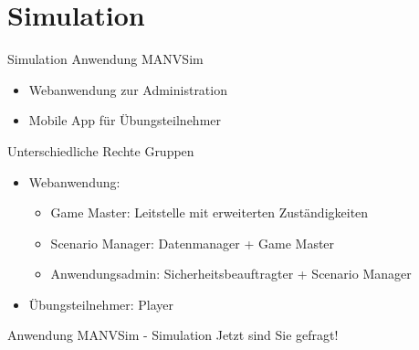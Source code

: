 %
%
\section{Simulation}

\begin{frame}{Simulation}
	Anwendung MANVSim
	\begin{itemize}
		\item Webanwendung zur Administration
		\item Mobile App für Übungsteilnehmer
	\end{itemize}
	Unterschiedliche Rechte Gruppen
	\begin{itemize}
		\item Webanwendung:
		\begin{itemize}
			\item Game Master: Leitstelle mit erweiterten Zuständigkeiten
			\item Scenario Manager: Datenmanager + Game Master
			\item Anwendungsadmin: Sicherheitsbeauftragter + Scenario Manager
		\end{itemize}
		\item Übungsteilnehmer: Player 
	\end{itemize}
\end{frame}

\begin{frame}{Anwendung MANVSim - Simulation}
	Jetzt sind Sie gefragt!
\end{frame}

